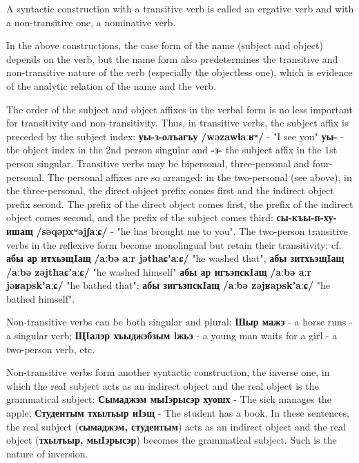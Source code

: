 \documentclass[a4paper,12pt]{book}
\newcommand{\1}[1]{\textbf{\emph{#1}}} %
\newcommand{\2}[1]{\textbf{[#1]}} %
\newcommand{\3}[1]{\fontsize{11pt}{0cm}\textbf{\emph{#1}}} %
\newcommand{\4}[1]{\fontsize{10pt}{0cm}\emph{#1}}	%
\newcommand{\5}[1]{\textbf{/#1/}} %
\newcommand{\6}[1]{\textbf{[#1]}} %
\newcommand{\7}[1]{\fontsize{12pt}{0cm}\emph{#1}} %
\newcommand{\8}[1]{\fontsize{12pt}{0cm}`#1'} %
\newcommand{\9}[1]{\fontsize{12pt}{0cm}(lit. `#1')} %
\newcommand{\glossphonemics}[1]{\textbf{/#1/}} %
\begin{document}
A syntactic construction with a transitive verb is called an ergative verb and with a non-transitive one, a nominative verb.

In the above constructions, the case form of the name (subject and object) depends on the verb, but the name form also predetermines the transitive and non-transitive nature of the verb (especially the objectless one), which is evidence of the analytic relation of the name and the verb.

The order of the subject and object affixes in the verbal form is no less important for transitivity and non-transitivity. Thus, in transitive verbs, the subject affix is preceded by the subject index: \textbf{уы-з-олъагъу} \glossphonemics{wəzawɬaːʁʷ} - "I see you" \textbf{уы-} - the object index in the 2nd person singular and \textbf{-з-} the subject affix in the 1st person singular. Transitive verbs may be bipersonal, three-personal and four-personal. The personal affixes are so arranged: in the two-personal (see above), in the three-personal, the direct object prefix comes first and the indirect object prefix second. The prefix of the direct object comes first, the prefix of the indirect object comes second, and the prefix of the subject comes third: \textbf{сы-къы-п-ху-ишащ} \glossphonemics{səqəpxʷəjʃaːɕ} - "he has brought me to you". The two-person transitive verbs in the reflexive form become monolingual but retain their transitivity: cf. \textbf{абы ар итхьэщIащ} \glossphonemics{aːbə aːr jətħaɕʼaːɕ} "he washed that", \textbf{абы зитхьэщIащ} \glossphonemics{aːbə zəjtħaɕʼaːɕ} "he washed himself" \textbf{абы ар игъэпскIащ} \glossphonemics{aːbə aːr jəʁapskʼaːɕ} "he bathed that"; \textbf{абы зигъэпскIащ} \glossphonemics{aːbə zəjʁapskʼaːɕ} "he bathed himself".

Non-transitive verbs can be both singular and plural: \textbf{Шыр мажэ} - a horse runs - a singular verb; \textbf{ЩIалэр хъыджэбзым lжьэ} - a young man waits for a girl - a two-person verb, etc.

Non-transitive verbs form another syntactic construction, the inverse one, in which the real subject acts as an indirect object and the real object is the grammatical subject: \textbf{Сымаджэм мыIэрысэр хуошх} - The sick manages the apple; \textbf{Студентым тхылъыр иIэщ} - The student has a book. In these sentences, the real subject (\textbf{сымаджэм, студентым}) acts as an indirect object and the real object (\textbf{тхылъыр, мыIэрысэр}) becomes the grammatical subject. Such is the nature of inversion.
\end{document}
